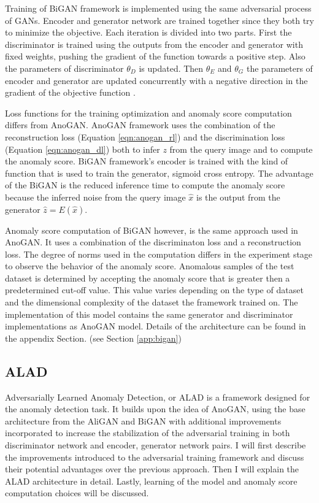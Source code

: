 Training of BiGAN framework is implemented using the same adversarial process of GANs. Encoder and
generator network are trained together since they both try to minimize the objective. Each iteration
is divided into two parts. First the discriminator is trained using the outputs from the encoder and
generator with fixed weights, pushing the gradient of the function towards a positive step. Also the
parameters of discriminator $\theta_D$ is updated. Then $\theta_E$ and $\theta_G$ the parameters of
encoder and generator are updated concurrently with a negative direction in the gradient of the
objective function \cite{Donahue2017AdversarialFL}.

Loss functions for the training optimization and anomaly score computation differs from AnoGAN\cite{Schlegl2017UnsupervisedAD}. 
AnoGAN framework uses the
combination of the reconstruction loss (Equation \ref{eqn:anogan_rl}) and the discrimination loss
(Equation \ref{eqn:anogan_dl}) both to infer $z$ from the query image and to compute the anomaly
score. BiGAN framework's encoder is trained with the kind of function that is used to train the
generator, sigmoid cross entropy. The advantage of the BiGAN is the reduced inference time to
compute the anomaly score because the inferred noise from the query image $\hat{x}$ is the output
from the generator $\hat{z} = E(\hat{x})$. 

Anomaly score computation of BiGAN however, is the same approach used in AnoGAN. It uses a
combination of the discriminaton loss and a reconstruction loss. The degree of norms used in the
computation differs in the experiment stage to observe the behavior of the anomaly score.
Anomalous samples of the test dataset is determined by accepting the anomaly score that is greater
then a predetermined cut-off value. This value varies depending on the type of dataset and the dimensional
complexity of the dataset the framework trained on.
The implementation of this model contains the same generator and discriminator implementations as AnoGAN model.
Details of the architecture can be found in the appendix Section. (see Section \ref{app:bigan})

\subsection{ALAD}
\label{sec:alad}

Adversarially Learned Anomaly Detection, or ALAD \cite{DBLP:journals/corr/abs-1812-02288} is a
framework designed for the anomaly detection task. It builds upon the idea of AnoGAN, using the base
architecture from the AliGAN and BiGAN with additional improvements incorporated to increase the
stabilization of the adversarial training in both  discriminator network and encoder, generator network pairs.
I will first describe the improvements introduced to the adversarial training framework and discuss
their potential advantages over the previous approach. Then I will explain the ALAD architecture in
detail. Lastly, learning of the model and anomaly score computation choices will be discussed. 

